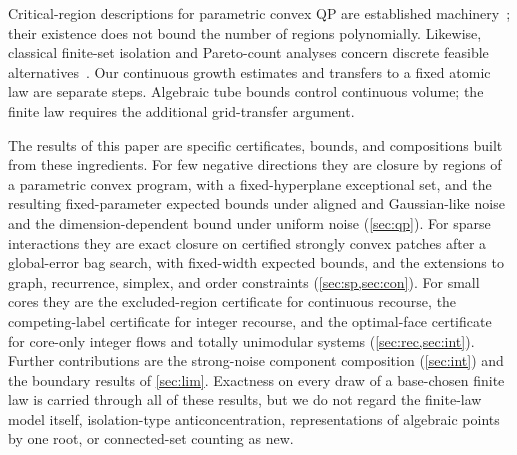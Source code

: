 Critical-region descriptions for parametric convex QP are established
machinery~\citep{tndel2003-an-algorithm-for-multi-parametric}; their existence
does not bound the number of regions polynomially. Likewise, classical
finite-set isolation and Pareto-count analyses concern discrete feasible
alternatives~\citep{mulmuley1987-matching-is-as-easy-as,beier2022-the-smoothed-number-of-pareto}.
Our continuous growth estimates and transfers to a fixed atomic law are
separate steps. Algebraic tube bounds control continuous volume; the finite
law requires the additional grid-transfer argument.

The results of this paper are specific certificates, bounds, and
compositions built from these ingredients. For few negative directions they are
closure by regions of a parametric convex program, with a fixed-hyperplane
exceptional set, and the resulting fixed-parameter expected bounds under
aligned and Gaussian-like noise and the dimension-dependent bound under
uniform noise (\cref{sec:qp}). For sparse interactions they are exact
closure on certified strongly convex patches after a global-error bag
search, with fixed-width expected bounds, and the extensions to graph,
recurrence, simplex, and order constraints (\cref{sec:sp,sec:con}). For small
cores they are the excluded-region certificate for continuous recourse, the
competing-label certificate for integer recourse, and the optimal-face
certificate for core-only integer flows and totally unimodular systems
(\cref{sec:rec,sec:int}). Further contributions are the strong-noise
component composition (\cref{sec:int}) and the boundary results of
\cref{sec:lim}. Exactness on every draw of a base-chosen finite law is
carried through all of these results, but we do not regard the finite-law
model itself, isolation-type anticoncentration, representations of
algebraic points by one root, or connected-set counting as new.

